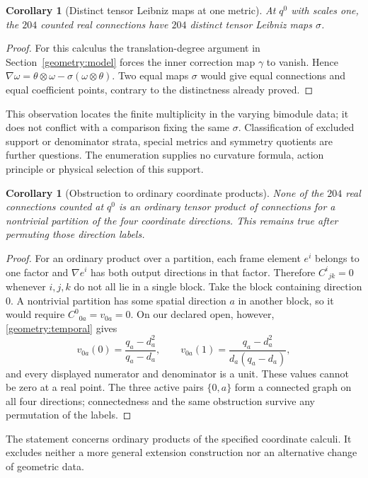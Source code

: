 \documentclass[11pt,a4paper]{article}
\newtheorem{corollary}[theorem]{Corollary}\newtheorem{definition}[theorem]{Definition}
\theoremstyle{remark}\newtheorem{remark}[theorem]{Remark}
\begin{document}
\begin{corollary}[Distinct tensor Leibniz maps at one metric]
At $q^0$ with scales one, the $204$ counted real connections have $204$
distinct tensor Leibniz maps $\sigma$.
\end{corollary}
\begin{proof}
For this calculus the translation-degree argument in
Section~\ref{geometry:model} forces the inner correction map $\gamma$
to vanish. Hence
$\nabla\omega=\theta\otimes\omega-\sigma(\omega\otimes\theta)$.
Two equal maps $\sigma$ would give equal connections and equal coefficient
points, contrary to the distinctness already proved.
\end{proof}

This observation locates the finite multiplicity in the varying
bimodule data; it does not conflict with a comparison fixing the same
$\sigma$. Classification of excluded support or denominator strata,
special metrics and symmetry quotients are further questions. The
enumeration supplies no curvature formula, action principle or physical
selection of this support.

\begin{corollary}[Obstruction to ordinary coordinate products]
\label{geometry:noproduct}
None of the $204$ real connections counted at $q^0$ is an ordinary
tensor product of connections for a nontrivial partition of the four
coordinate directions. This remains true after permuting those direction
labels.
\end{corollary}
\begin{proof}
For an ordinary product over a partition, each frame element $e^i$
belongs to one factor and $\nabla e^i$ has both output directions in
that factor. Therefore $C^i{}_{jk}=0$ whenever $i,j,k$ do not all lie
in a single block. Take the block containing direction $0$. A nontrivial
partition has some spatial direction $a$ in another block, so it would
require $C^0{}_{0a}=v_{0a}=0$. On our declared open, however,
\eqref{geometry:temporal} gives
\[
 v_{0a}(0)=\frac{q_a-d_a^2}{q_a-d_a},\qquad
 v_{0a}(1)=\frac{q_a-d_a^2}{d_a(q_a-d_a)},
\]
and every displayed numerator and denominator is a unit. These values
cannot be zero at a real point. The three active pairs $\{0,a\}$
form a connected graph on all four directions; connectedness and the
same obstruction survive any permutation of the labels.
\end{proof}

The statement concerns ordinary products of the specified coordinate
calculi. It excludes neither a more general extension construction nor
an alternative change of geometric data.
\end{document}
